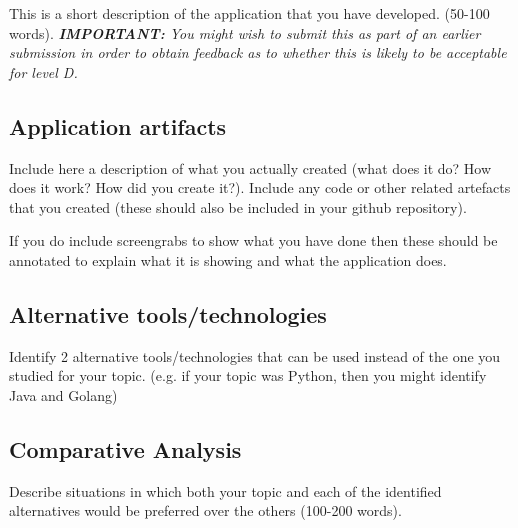 \documentclass[a4paper, 11pt]{report}
\begin{document}
This is a short description of the application that you have developed. (50-100 words).
\textit{{\bf IMPORTANT:} You might wish to submit this as part of an earlier submission in order to obtain feedback as to whether this is likely to be acceptable for level D.}

\subsection{Application artifacts}

Include here a description of what you actually created (what does it do? How does it work? How did you create it?). Include any code or other related artefacts that you created (these should also be included in your github repository).

If you do include screengrabs to show what you have done then these should be annotated to explain what it is showing and what the application does.

\subsection{Alternative tools/technologies}
Identify 2 alternative tools/technologies that can be used instead of the one you studied for your topic. (e.g. if your topic was Python, then you might identify Java and Golang)
\subsection{Comparative Analysis}
Describe situations in which both your topic and each of the identified alternatives would be preferred over the others (100-200 words).




\newpage



\end{document}
